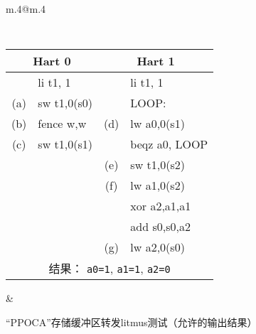 \begin{figure}[h!]
  \centering
  \begin{tabular}{m{.4\linewidth}@{\qquad}m{.4\linewidth}}
  {
    \tt\small
    \begin{tabular}{cl||cl}
    \multicolumn{2}{c}{Hart 0} & \multicolumn{2}{c}{Hart 1} \\
    \hline
          & li t1, 1    &     & li t1, 1      \\
      (a) & sw t1,0(s0) &     & LOOP:         \\
      (b) & fence w,w   & (d) & lw a0,0(s1)   \\
      (c) & sw t1,0(s1) &     & beqz a0, LOOP \\
          &             & (e) & sw t1,0(s2)   \\
          &             & (f) & lw a1,0(s2)   \\
          &             &     & xor a2,a1,a1  \\
          &             &     & add s0,s0,a2  \\
          &             & (g) & lw a2,0(s0)   \\
      \hline
      \multicolumn{4}{c}{结果： {\tt a0=1}, {\tt a1=1}, {\tt a2=0}}
    \end{tabular}
  }
  &
  
  \end{tabular}
  \caption{“PPOCA”存储缓冲区转发litmus测试（允许的输出结果）}
  \label{fig:litmus:ppoca}
\end{figure}

